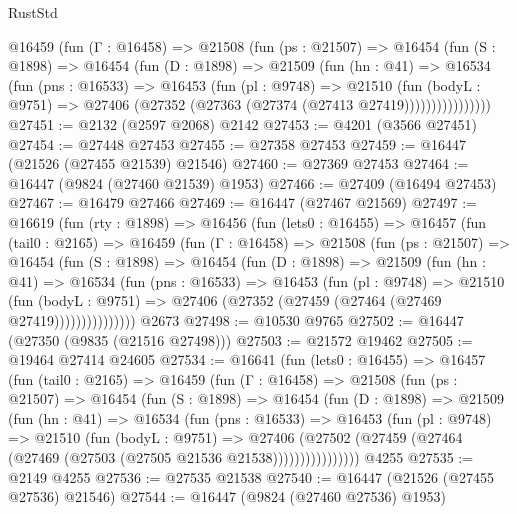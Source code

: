 \begin{lexlean}{RustStd}
\begin{coremodule}
          @16459
            (fun (Γ : @16458) =>
            @21508
              (fun (ps : @21507) =>
              @16454
                (fun (S : @1898) =>
                @16454
                  (fun (D : @1898) =>
                  @21509
                    (fun (hn : @41) =>
                    @16534
                      (fun (pns : @16533) =>
                      @16453
                        (fun (pl : @9748) =>
                        @21510
                          (fun (bodyL : @9751) =>
                          @27406 (@27352 (@27363 (@27374 (@27413 @27419))))))))))))))))
@27451 := @2132 (@2597 @2068) @2142
@27453 := @4201 (@3566 @27451)
@27454 := @27448 @27453
@27455 := @27358 @27453
@27459 := @16447 (@21526 (@27455 @21539) @21546)
@27460 := @27369 @27453
@27464 := @16447 (@9824 (@27460 @21539) @1953)
@27466 := @27409 (@16494 @27453)
@27467 := @16479 @27466
@27469 := @16447 (@27467 @21569)
@27497 := @16619
    (fun (rty : @1898) =>
    @16456
      (fun (lets0 : @16455) =>
      @16457
        (fun (tail0 : @2165) =>
        @16459
          (fun (Γ : @16458) =>
          @21508
            (fun (ps : @21507) =>
            @16454
              (fun (S : @1898) =>
              @16454
                (fun (D : @1898) =>
                @21509
                  (fun (hn : @41) =>
                  @16534
                    (fun (pns : @16533) =>
                    @16453
                      (fun (pl : @9748) =>
                      @21510
                        (fun (bodyL : @9751) =>
                        @27406 (@27352 (@27459 (@27464 (@27469 @27419)))))))))))))))
    @2673
@27498 := @10530 @9765
@27502 := @16447 (@27350 (@9835 (@21516 @27498)))
@27503 := @21572 @19462
@27505 := @19464 @27414 @24605
@27534 := @16641
    (fun (lets0 : @16455) =>
    @16457
      (fun (tail0 : @2165) =>
      @16459
        (fun (Γ : @16458) =>
        @21508
          (fun (ps : @21507) =>
          @16454
            (fun (S : @1898) =>
            @16454
              (fun (D : @1898) =>
              @21509
                (fun (hn : @41) =>
                @16534
                  (fun (pns : @16533) =>
                  @16453
                    (fun (pl : @9748) =>
                    @21510
                      (fun (bodyL : @9751) =>
                      @27406
                        (@27502
                          (@27459 (@27464 (@27469 (@27503 (@27505 @21536 @21538))))))))))))))))
    @4255
@27535 := @2149 @4255
@27536 := @27535 @21538
@27540 := @16447 (@21526 (@27455 @27536) @21546)
@27544 := @16447 (@9824 (@27460 @27536) @1953)

\end{coremodule}
\end{lexlean}
